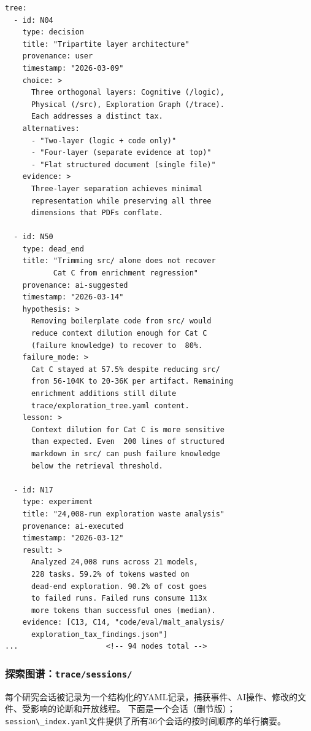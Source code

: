 \documentclass[
]{article}
\newcommand{\passthrough}[1]{#1}
\theoremstyle{definition}
\begin{document}
\begin{lstlisting}
tree:
  - id: N04
    type: decision
    title: "Tripartite layer architecture"
    provenance: user
    timestamp: "2026-03-09"
    choice: >
      Three orthogonal layers: Cognitive (/logic),
      Physical (/src), Exploration Graph (/trace).
      Each addresses a distinct tax.
    alternatives:
      - "Two-layer (logic + code only)"
      - "Four-layer (separate evidence at top)"
      - "Flat structured document (single file)"
    evidence: >
      Three-layer separation achieves minimal
      representation while preserving all three
      dimensions that PDFs conflate.

  - id: N50
    type: dead_end
    title: "Trimming src/ alone does not recover
           Cat C from enrichment regression"
    provenance: ai-suggested
    timestamp: "2026-03-14"
    hypothesis: >
      Removing boilerplate code from src/ would
      reduce context dilution enough for Cat C
      (failure knowledge) to recover to  80%.
    failure_mode: >
      Cat C stayed at 57.5% despite reducing src/
      from 56-104K to 20-36K per artifact. Remaining
      enrichment additions still dilute
      trace/exploration_tree.yaml content.
    lesson: >
      Context dilution for Cat C is more sensitive
      than expected. Even  200 lines of structured
      markdown in src/ can push failure knowledge
      below the retrieval threshold.

  - id: N17
    type: experiment
    title: "24,008-run exploration waste analysis"
    provenance: ai-executed
    timestamp: "2026-03-12"
    result: >
      Analyzed 24,008 runs across 21 models,
      228 tasks. 59.2% of tokens wasted on
      dead-end exploration. 90.2% of cost goes
      to failed runs. Failed runs consume 113x
      more tokens than successful ones (median).
    evidence: [C13, C14, "code/eval/malt_analysis/
      exploration_tax_findings.json"]
...                    <!-- 94 nodes total -->
\end{lstlisting}

\subsubsection{\texorpdfstring{探索图谱：\texttt{trace/sessions/}}{探索图谱：trace/sessions/}}\label{ux63a2ux7d22ux56feux8c31tracesessions}

每个研究会话被记录为一个结构化的YAML记录，捕获事件、AI操作、修改的文件、受影响的论断和开放线程。
下面是一个会话（删节版）；\passthrough{\lstinline!session\_index.yaml!}文件提供了所有36个会话的按时间顺序的单行摘要。
\end{document}
